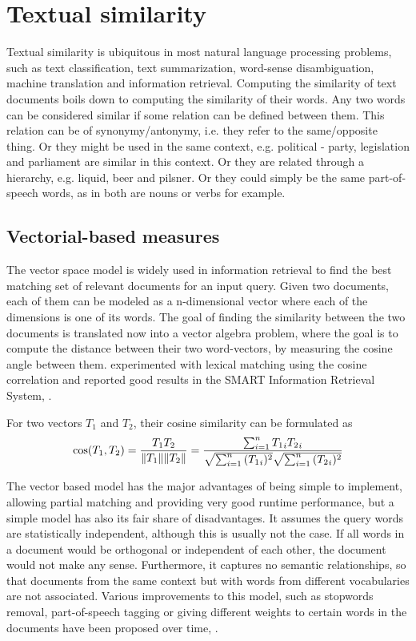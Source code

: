 \clearpage

\section{Textual similarity}\label{section:textual-similarity}

Textual similarity is ubiquitous in most natural language processing problems, such as text classification, text summarization, word-sense disambiguation, machine translation and information retrieval. Computing the similarity of text documents boils down to computing the similarity of their words. Any two words can be considered similar if some relation can be defined between them. This relation can be of synonymy/antonymy, i.e. they refer to the same/opposite thing. Or they might be used in the same context, e.g. political - party, legislation and parliament are similar in this context. Or they are related through a hierarchy, e.g. liquid, beer and pilsner. Or they could simply be the same part-of-speech words, as in both are nouns or verbs for example.

\subsection{Vectorial-based measures}\label{section:vectorial-based-measures}

The vector space model is widely used in information retrieval to find the best matching set of relevant documents for an input query. Given two documents, each of them can be modeled as a n-dimensional vector where each of the dimensions is one of its words. The goal of finding the similarity between the two documents is translated now into a vector algebra problem, where the goal is to compute the distance between their two word-vectors, by measuring the cosine angle between them. \citet{Salton1971} experimented with lexical matching using the cosine correlation and reported good results in the SMART Information Retrieval System, \citet{SMART}.

For two vectors $T_1$ and $T_2$, their cosine similarity can be formulated as
\begin{equation}
\cos ({ T_1},{ T_2})= {{T_1} {T_2} \over \|{ T_1}\| \|{ T_2}\|} = \frac{ \sum_{i=1}^{n}{{ T_1}_i{ T_2}_i} }{ \sqrt{\sum_{i=1}^{n}{({ T_1}_i)^2}} \sqrt{\sum_{i=1}^{n}{({ T_2}_i)^2}} }
\end{equation}

The vector based model has the major advantages of being simple to implement, allowing partial matching and providing very good runtime performance, but a simple model has also its fair share of disadvantages. It assumes the query words are statistically independent, although this is usually not the case. If all words in a document would be orthogonal or independent of each other, the document would not make any sense. Furthermore, it captures no semantic relationships, so that documents from the same context but with words from different vocabularies are not associated. Various improvements to this model, such as stopwords removal, part-of-speech tagging or giving different weights to certain words in the documents  have been proposed over time, \citet{Salton1988}.

